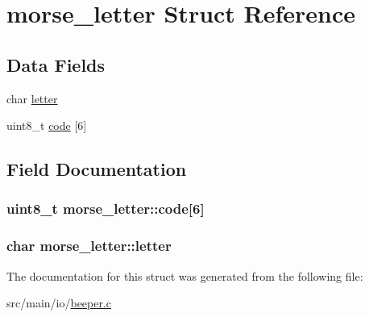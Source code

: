 \hypertarget{structmorse__letter}{\section{morse\+\_\+letter Struct Reference}
\label{structmorse__letter}
}
\subsection*{Data Fields}
\begin{DoxyCompactItemize}
\item 
char \hyperlink{structmorse__letter_aba281f3d3c1ee3b8881a8262523e360f}{letter}
\item 
uint8\+\_\+t \hyperlink{structmorse__letter_a9bc98b000246d9b522dbb4ed197285d8}{code} \mbox{[}6\mbox{]}
\end{DoxyCompactItemize}


\subsection{Field Documentation}
\hypertarget{structmorse__letter_a9bc98b000246d9b522dbb4ed197285d8}{
\subsubsection[{code}]{\setlength{\rightskip}{0pt plus 5cm}uint8\+\_\+t morse\+\_\+letter\+::code\mbox{[}6\mbox{]}}}\label{structmorse__letter_a9bc98b000246d9b522dbb4ed197285d8}
\hypertarget{structmorse__letter_aba281f3d3c1ee3b8881a8262523e360f}{
\subsubsection[{letter}]{\setlength{\rightskip}{0pt plus 5cm}char morse\+\_\+letter\+::letter}}\label{structmorse__letter_aba281f3d3c1ee3b8881a8262523e360f}


The documentation for this struct was generated from the following file\+:\begin{DoxyCompactItemize}
\item 
src/main/io/\hyperlink{beeper_8c}{beeper.\+c}\end{DoxyCompactItemize}
